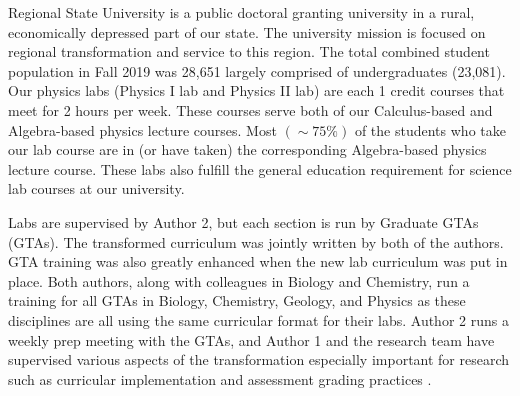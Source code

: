 \documentclass[aip, numerical, preprint]{revtex4-2}
\begin{document}
Regional State University is a public doctoral granting university in a rural, economically
depressed part of our state.  The university mission is focused on regional transformation and
service to this region.  The total combined student population in Fall 2019 was 28,651 largely
comprised of undergraduates (23,081). Our physics labs (Physics \textrm{I} lab and Physics
\textrm{II} lab) are each 1 credit courses that meet for 2 hours per week. These courses serve
both of our Calculus-based and Algebra-based physics lecture courses.  Most $(\sim 75\%)$ of
the students who take our lab course are in (or have taken) the corresponding Algebra-based
physics lecture course. These labs also fulfill the general education requirement for science
lab courses at our university.

Labs are supervised by Author 2, but each section is run by Graduate GTAs (GTAs). The
transformed curriculum was jointly written by both of the authors.  GTA training was also greatly
enhanced when the new lab curriculum was put in place.  Both authors, along with colleagues in
Biology and Chemistry, run a training for all GTAs in Biology, Chemistry, Geology, and Physics
as these disciplines are all using the same curricular format for their labs.  Author 2 runs a
weekly prep meeting with the GTAs, and Author 1 and the research team have supervised various
aspects of the transformation especially important for research such as curricular
implementation \citep{SmithJoyner2020} and assessment grading practices \citep{Wolf2019}.
\end{document}
